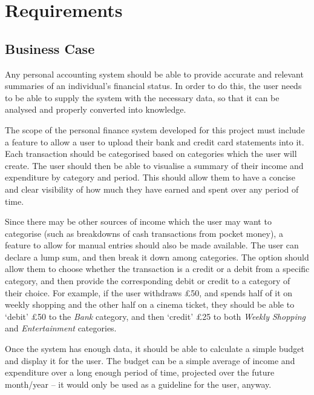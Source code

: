 \section{Requirements} \label{sec:Requirements}

\subsection{Business Case} \label{sec:Requirements.BusinessCase}
Any personal accounting system should be able to provide accurate and relevant
summaries of an individual's financial status. In order to do this, the user
needs to be able to supply the system with the necessary data, so that it can
be analysed and properly converted into knowledge.

The scope of the personal finance system developed for this project must
include a feature to allow a user to upload their bank and credit card
statements into it. Each transaction should be categorised based on categories
which the user will create. The user should then be able to visualise a summary
of their income and expenditure by category and period. This should allow them
to have a concise and clear visibility of how much they have earned and spent
over any period of time.

Since there may be other sources of income which the user may want to
categorise (such as breakdowns of cash transactions from pocket money), a
feature to allow for manual entries should also be made available. The user can
declare a lump sum, and then break it down among categories. The option should
allow them to choose whether the transaction is a credit or a debit from a
specific category, and then provide the corresponding debit or credit to a
category of their choice. For example, if the user withdraws \pounds50, and
spends half of it on weekly shopping and the other half on a cinema ticket,
they should be able to `debit' \pounds50 to the \emph{Bank} category, and then
`credit' \pounds25 to both \emph{Weekly Shopping} and \emph{Entertainment}
categories.

Once the system has enough data, it should be able to calculate a simple budget
and display it for the user. The budget can be a simple average of income and
expenditure over a long enough period of time, projected over the future
month/year -- it would only be used as a guideline for the user, anyway.

